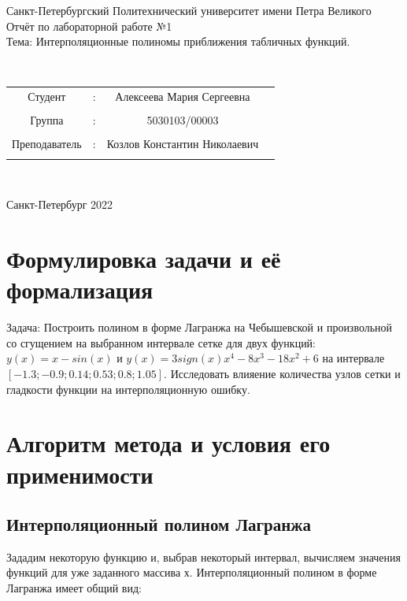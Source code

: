 \documentclass[a4paper]{article}
\begin{document}
\begin{center} 
\hfill \break 
\large{Санкт-Петербургский Политехнический университет имени Петра Великого}\\ 
 
 \hfill \break 
\hfill\break 
\hfill \break 
\hfill \break 
\hfill \break 
\large{Отчёт по лабораторной работе №1}\\ 
\hfill \break 
\large{Тема: Интерполяционные  полиномы    приближения  табличных  функций. } 
\hfill \break 
\hfill \break 
 
\hfill \break 
\hfill \break 
\\ 
\hfill \break 
\hfill \break 
\end{center} 


\normalsize{ 
\begin{tabular}{cccc} 
Студент & : & Алексеева Мария Сергеевна\\\\ 
Группа & : & 5030103/00003 \\\\ 
Преподаватель & : & Козлов Константин Николаевич \\\\ 
\end{tabular} 
}\\ 
\hfill \break 
\hfill \break 
\hfill \break 
\begin{center} Санкт-Петербург 2022 \end{center} 
\thispagestyle{empty} %
 
\newpage 
	
\section{Формулировка задачи и её формализация} 
Задача: Построить полином в форме Лагранжа на Чебышевской и произвольной со сгущением на выбранном интервале сетке для двух функций: $ y(x) = x - sin(x)$ и $ y(x) = 3sign(x)x^{4}-8x^{3}-18x^{2}+6$ на интервале $[-1.3;-0.9;0.14;0.53;0.8;1.05]$. Исследовать влияение количества узлов сетки и гладкости функции на интерполяционную ошибку.
\section{Алгоритм метода и условия его применимости} 
\subsection{Интерполяционный полином Лагранжа} 
Зададим некоторую функцию и, выбрав некоторый интервал, вычисляем значения функций для уже заданного массива х. 
Интерполяционный полином в форме Лагранжа имеет общий вид:\\
\end{document}
